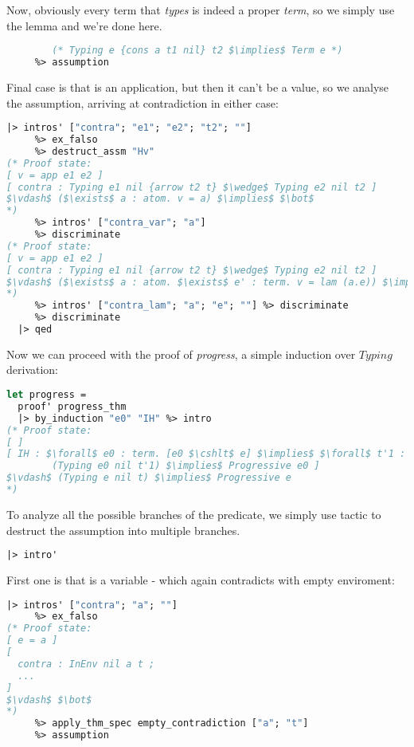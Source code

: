 \documentclass[english, mgr]{iithesis}
\newcommand{\lstt}[1]{\text{{\lstinline[columns=fixed,mathescape]|#1|}}}
\renewcommand{\it}[1]{\textit{#1}}
\begin{document}
Now, obviously every term that \it{types} is indeed a proper \it{term},
so we simply use the \lstt{typing\_terms} lemma and we're done here.
\begin{lstlisting}[mathescape,language=OCaml,escapebegin=\color{codegreen}]
     %> apply_thm_spec typing_terms ["e"; "cons a t1 nil"; "t2"]
        (* Typing e {cons a t1 nil} t2 $\implies$ Term e *)
     %> assumption
\end{lstlisting}
Final case is that \lstt{e} is an application, but then it can't be a value,
so we analyse the \lstt{Hv} assumption, arriving at contradiction in either case:
\begin{lstlisting}[mathescape, language=OCaml]
  |> intros' ["contra"; "e1"; "e2"; "t2"; ""]
     %> ex_falso
     %> destruct_assm "Hv"
(* Proof state:
[ v = app e1 e2 ]
[ contra : Typing e1 nil {arrow t2 t} $\wedge$ Typing e2 nil t2 ]
$\vdash$ ($\exists$ a : atom. v = a) $\implies$ $\bot$
*)
     %> intros' ["contra_var"; "a"]
     %> discriminate
(* Proof state:
[ v = app e1 e2 ]
[ contra : Typing e1 nil {arrow t2 t} $\wedge$ Typing e2 nil t2 ]
$\vdash$ ($\exists$ a : atom. $\exists$ e' : term. v = lam (a.e)) $\implies$ $\bot$
*)
     %> intros' ["contra_lam"; "a"; "e"; ""] %> discriminate
     %> discriminate
  |> qed
\end{lstlisting}
Now we can proceed with the proof of \it{progress}, a simple induction over $Typing$ derivation:
\begin{lstlisting}[mathescape, language=OCaml]
let progress =
  proof' progress_thm
  |> by_induction "e0" "IH" %> intro
(* Proof state:
[ ]
[ IH : $\forall$ e0 : term. [e0 $\cshlt$ e] $\implies$ $\forall$ t'1 : term.
        (Typing e0 nil t'1) $\implies$ Progressive e0 ]
$\vdash$ (Typing e nil t) $\implies$ Progressive e
*)
\end{lstlisting}
To analyze all the possible branches of the \lstt{Typing} predicate,
we simply use \lstt{{intro'}} tactic to destruct the assumption into multiple branches.
\begin{lstlisting}[language=OCaml]
  |> intro'
\end{lstlisting}
First one is that \lstt{e} is a variable - which again contradicts with empty enviroment:
\begin{lstlisting}[language=OCaml, mathescape]
  |> intros' ["contra"; "a"; ""]
     %> ex_falso
(* Proof state:
[ e = a ]
[
  contra : InEnv nil a t ;
  ...
]
$\vdash$ $\bot$
*)
     %> apply_thm_spec empty_contradiction ["a"; "t"]
     %> assumption
\end{lstlisting}
\end{document}
